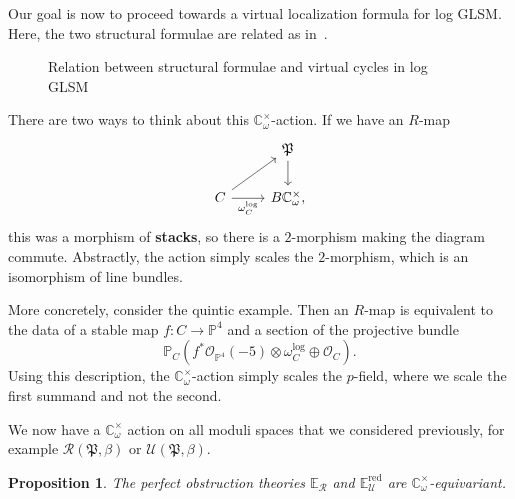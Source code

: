 \documentclass[10pt]{amsart}
\newtheorem{prop}[thm]{Proposition}
\theoremstyle{definition}
\theoremstyle{remark}
\theoremstyle{plain}
\theoremstyle{definition}
\theoremstyle{remark}
\newcommand{\C}{\mathbb{C}}
\newcommand{\E}{\mathbb{E}}
\renewcommand{\P}{\mathbb{P}}
\newcommand{\mc}[1]{\mathcal{#1}}
\newcommand{\mf}[1]{\mathfrak{#1}}
\newcommand{\mr}[1]{\mathrm{#1}}
\newcommand{\1}{\mathbf{1}}
\newcommand{\2}{\mathbf{2}}
\newcommand{\3}{\mathbf{3}}
\newcommand{\vir}{\mr{vir}}
\newcommand{\red}{\mr{red}}
\begin{document}
Our goal is now to proceed towards a virtual localization formula for log GLSM. Here, the two structural formulae are related as in~.

\begin{figure}[htpb]
\begin{center}
\end{center}
\caption{Relation between structural formulae and virtual cycles in log GLSM}%
\label{fig:structural}
\end{figure}

There are two ways to think about this $\C_{\omega}^{\times}$-action. If we have an $R$-map
\begin{equation*}
\begin{tikzcd}
     & \mf{P} \ar{d} \\
    C \ar[swap]{r}{\omega_C^{\log}} \ar{ur} & B \C_{\omega}^{\times},
\end{tikzcd}
\end{equation*}
this was a morphism of \textbf{stacks}, so there is a $2$-morphism making the diagram commute. Abstractly, the action simply scales the $2$-morphism, which is an isomorphism of line bundles.

More concretely, consider the quintic example. Then an $R$-map is equivalent to the data of a stable map $f \colon C \to \P^4$ and a section of the projective bundle
\[ \P_C (f^* \mc{O}_{\P^4}(-5) \otimes \omega_C^{\log} \oplus \mc{O}_C). \]
Using this description, the $\C_{\omega}^{\times}$-action simply scales the $p$-field, where we scale the first summand and not the second.

We now have a $\C_{\omega}^{\times}$ action on all moduli spaces that we considered previously, for example $\mc{R}(\mf{P}, \beta)$ or $\mc{U}(\mf{P}, \beta)$.

\begin{prop}
    The perfect obstruction theories $\E_{\mc{R}}$ and $\E_{\mc{U}}^{\red}$ are $\C_{\omega}^{\times}$-equivariant.
\end{prop}
\end{document}
